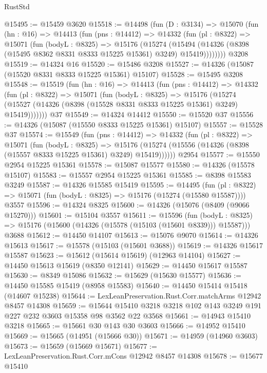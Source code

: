 \begin{lexlean}{RustStd}
\begin{coremodule}
@15495 := @15459 @3620
@15518 := @14498
    (fun (D : @3134) =>
    @15070
      (fun (hn : @16) =>
      @14413
        (fun (pns : @14412) =>
        @14332
          (fun (pl : @8322) =>
          @15071
            (fun (bodyL : @8325) =>
            @15176
              (@15274
                (@15494
                  (@14326 (@8398 (@15495 @8362 @8331 @8333 @15225 @15361) @3249) @15419))))))))
    @3208
@15519 := @14324 @16
@15520 := @15486 @3208
@15527 := @14326 (@15087 (@15520 @8331 @8333 @15225 @15361) @15107)
@15528 := @15495 @3208
@15548 := @15519
    (fun (hn : @16) =>
    @14413
      (fun (pns : @14412) =>
      @14332
        (fun (pl : @8322) =>
        @15071
          (fun (bodyL : @8325) =>
          @15176
            (@15274 (@15527 (@14326 (@8398 (@15528 @8331 @8333 @15225 @15361) @3249) @15419)))))))
    @37
@15549 := @14324 @14412
@15550 := @15520 @37
@15556 := @14326 (@15087 (@15550 @8333 @15225 @15361) @15107)
@15557 := @15528 @37
@15574 := @15549
    (fun (pns : @14412) =>
    @14332
      (fun (pl : @8322) =>
      @15071
        (fun (bodyL : @8325) =>
        @15176 (@15274 (@15556 (@14326 (@8398 (@15557 @8333 @15225 @15361) @3249) @15419))))))
    @2954
@15577 := @15550 @2954 @15225 @15361
@15578 := @15087 @15577
@15580 := @14326 (@15578 @15107)
@15583 := @15557 @2954 @15225 @15361
@15585 := @8398 @15583 @3249
@15587 := @14326 @15585 @15419
@15595 := @14495
    (fun (pl : @8322) => @15071 (fun (bodyL : @8325) => @15176 (@15274 (@15580 @15587))))
    @3557
@15596 := @14324 @8325
@15600 := @14326 (@15076 (@8409 (@9066 @15270)))
@15601 := @15104 @3557
@15611 := @15596
    (fun (bodyL : @8325) => @15176 (@15600 (@14326 (@15578 (@15103 (@15601 @8339))) @15587)))
    @3688
@15612 := @14450 @14107
@15613 := @15076 @9070
@15614 := @14326 @15613
@15617 := @15578 (@15103 (@15601 @3688))
@15619 := @14326 @15617 @15587
@15623 := @15612 (@15614 @15619) (@12963 @14104)
@15627 := @14450 @15613 @15619 (@8350 @12141)
@15629 := @14450 @15617 @15587
@15630 := @8349 @15086
@15632 := @15629 (@15630 @15577)
@15636 := @14450 @15585 @15419 (@8958 @15583)
@15640 := @14450 @15414 @15418 (@14607 @15238)
@15644 := LexLeanPreservation.Rust.Corr.matchArms @12942 @8457 @14308
@15659 := @15644 @15410 @3218 @3218 @102 @143 @3249 @191 @227 @232 @3603 @15358 @98 @3562 @22 @3568
@15661 := @14943 @15410 @3218
@15665 := @15661 @30 @143 @30 @3603
@15666 := @14952 @15410
@15669 := @15665 (@14951 (@15666 @30))
@15671 := @14959 (@14960 @3603)
@15673 := @15659 (@15669 @15671)
@15677 := LexLeanPreservation.Rust.Corr.mCons @12942 @8457 @14308
@15678 := @15677 @15410

\end{coremodule}
\end{lexlean}
